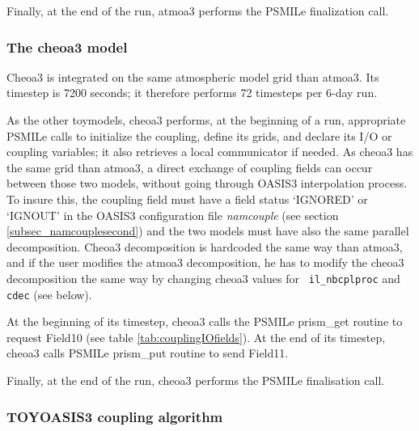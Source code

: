

Finally, at the end of the run, atmoa3 performs the PSMILe finalization call.

\subsubsection{The cheoa3 model}
\label{sec:cheoa3} 

Cheoa3
is integrated on the same atmospheric model grid than atmoa3. Its
timestep is 7200 seconds; it therefore performs 72 timesteps per 6-day
run.

As the other toymodels, cheoa3 performs, at the beginning of a run,
appropriate PSMILe calls to initialize the coupling, define its grids,
and declare its I/O or coupling variables; it also retrieves a local
communicator if needed. As cheoa3 has the same grid than atmoa3, a direct
exchange of coupling fields can occur between those two models,
without going through OASIS3 interpolation process. To insure this,
the coupling field must have a field status `IGNORED' or `IGNOUT' in
the OASIS3 configuration file {\it namcouple} (see section
\ref{subsec_namcouplesecond}) and the two models must have also the same
parallel decomposition.  Cheoa3 decomposition is hardcoded the same way
than atmoa3, and if the user modifies the atmoa3 decomposition, he has to
modify the cheoa3 decomposition the same way by changing cheoa3 values for {\tt
il\_nbcplproc} and {\tt cdec} (see below).

At the beginning of its timestep, cheoa3 calls the PSMILe prism\_get
routine to request Field10 (see table \ref{tab:couplingIOfields}). At
the end of its timestep, cheoa3 calls PSMILe prism\_put routine to send
Field11. 

Finally, at the end of the run, cheoa3 performs the PSMILe finalisation call.

\subsubsection{TOYOASIS3 coupling algorithm}

